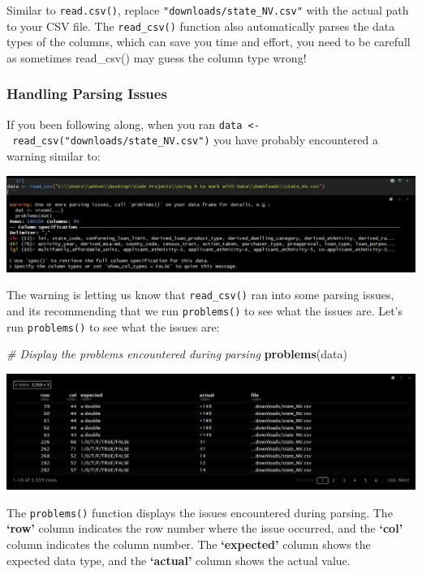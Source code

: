 \documentclass[
]{book}
\newenvironment{Shaded}{\begin{snugshade}}{\end{snugshade}}
\newcommand{\CommentTok}[1]{\textcolor[rgb]{0.56,0.35,0.01}{\textit{#1}}}
\newcommand{\FunctionTok}[1]{\textcolor[rgb]{0.13,0.29,0.53}{\textbf{#1}}}
\newcommand{\NormalTok}[1]{#1}
\begin{document}
Similar to \texttt{read.csv()}, replace \texttt{"downloads/state\_NV.csv"} with the actual path to your CSV file. The \texttt{read\_csv()} function also automatically parses the data types of the columns, which can save you time and effort, {you need to be carefull as sometimes read\_csv() may guess the column type wrong!}

\subsubsection{Handling Parsing Issues}\label{handling-parsing-issues}

If you been following along, when you ran \texttt{data\ \textless{}-\ read\_csv("downloads/state\_NV.csv")} you have probably encountered a {warning} similar to:

\includegraphics{images/clipboard-3586307356.png}

The warning is letting us know that \texttt{read\_csv()} ran into some parsing issues, and its recommending that we run \texttt{problems()} to see what the issues are. Let's run \texttt{problems()} to see what the issues are:

\begin{Shaded}
\begin{Highlighting}[]
\CommentTok{\# Display the problems encountered during parsing}
\FunctionTok{problems}\NormalTok{(data)}
\end{Highlighting}
\end{Shaded}

\includegraphics{images/clipboard-1927136276.png}

The \texttt{problems()} function displays the issues encountered during parsing. The \textbf{`row'} column indicates the row number where the issue occurred, and the \textbf{`col'} column indicates the column number. The \textbf{`expected'} column shows the expected data type, and the \textbf{`actual'} column shows the actual value.
\end{document}
